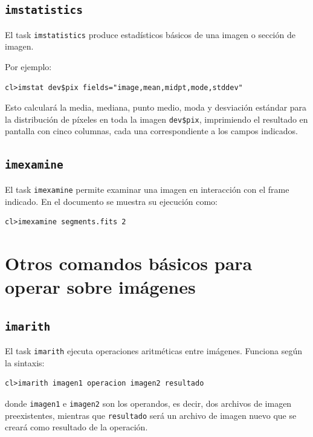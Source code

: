 \subsection{\texttt{imstatistics}}

El task \texttt{imstatistics} produce estadísticos básicos de una imagen o sección de imagen.

Por ejemplo:

\begin{verbatim}
cl>imstat dev$pix fields="image,mean,midpt,mode,stddev"
\end{verbatim}

Esto calculará la media, mediana, punto medio, moda y desviación estándar para la distribución de píxeles en toda la imagen \texttt{dev\$pix}, imprimiendo el resultado en pantalla con cinco columnas, cada una correspondiente a los campos indicados.

\subsection{\texttt{imexamine}}

El task \texttt{imexamine} permite examinar una imagen en interacción con el frame indicado. En el documento se muestra su ejecución como:

\begin{verbatim}
cl>imexamine segments.fits 2
\end{verbatim}

\section{Otros comandos básicos para operar sobre imágenes}

\subsection{\texttt{imarith}}

El task \texttt{imarith} ejecuta operaciones aritméticas entre imágenes. Funciona según la sintaxis:

\begin{verbatim}
cl>imarith imagen1 operacion imagen2 resultado
\end{verbatim}

donde \texttt{imagen1} e \texttt{imagen2} son los operandos, es decir, dos archivos de imagen preexistentes, mientras que \texttt{resultado} será un archivo de imagen nuevo que se creará como resultado de la operación.

